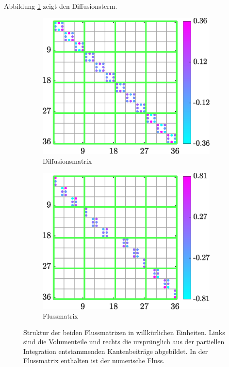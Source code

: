 Abbildung \ref{fig:matrix_L} zeigt den Diffusionsterm.
\begin{figure}
    \centering
    \begin{subfigure}[b]{0.475\textwidth}
        \centering
        \includegraphics[width=\textwidth]{plots/L_glob.eps}
        \caption[]%
        {{\small Diffusionsmatrix}}
        \label{fig:matrix_L}
    \end{subfigure}
    \hfill
    \begin{subfigure}[b]{0.475\textwidth}
        \centering
        \includegraphics[width=\textwidth]{plots/F_glob.eps}
        \caption[]%
        {{\small Flussmatrix}}
        \label{fig:matrix_F}
    \end{subfigure}
    \caption[]
    {Struktur der beiden Flussmatrizen in willkürlichen Einheiten. Links sind die Volumenteile und rechts die ursprünglich aus der partiellen Integration entstammenden Kantenbeiträge abgebildet. In der Flussmatrix enthalten ist der numerische Fluss.}
\end{figure}
